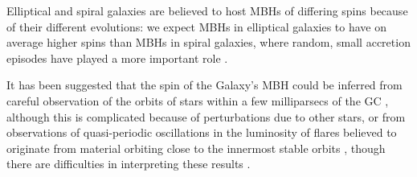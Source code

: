 Elliptical and spiral galaxies are believed to host MBHs of differing spins because of their different evolutions: we expect MBHs in elliptical galaxies to have on average higher spins than MBHs in spiral galaxies, where random, small accretion episodes have played a more important role \citep{Volonteri2007, Sikora2007}.

It has been suggested that the spin of the Galaxy's MBH could be inferred from careful observation of the orbits of stars within a few milliparsecs of the GC \citep{Merritt2010}, although this is complicated because of perturbations due to other stars, or from observations of quasi-periodic oscillations in the luminosity of flares believed to originate from material orbiting close to the innermost stable orbits \citep{Genzel2003a, Belanger2006, Trippe2007, Hamaus2009, Kato2010}, though there are difficulties in interpreting these results \citep{Psaltis2008a}.



